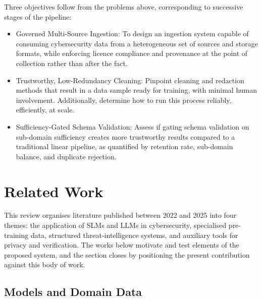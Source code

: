 \documentclass[conference]{IEEEtran}
\begin{document}
Three objectives follow from the problems above, corresponding to successive stages of the pipeline:
\begin{itemize}
\item Governed Multi-Source Ingestion: To design an ingestion system capable of consuming cybersecurity data from a heterogeneous set of sources and storage formats, while enforcing licence compliance and provenance at the point of collection rather than after the fact.
\item Trustworthy, Low-Redundancy Cleaning: Pinpoint cleaning and redaction methods that result in a data sample ready for training, with minimal human involvement. Additionally, determine how to run this process reliably, efficiently, at scale.
\item Sufficiency-Gated Schema Validation: Assess if gating schema validation on sub-domain sufficiency creates more trustworthy results compared to a traditional linear pipeline, as quantified by retention rate, sub-domain balance, and duplicate rejection.
\end{itemize}

\section{Related Work}

This review organises literature published between 2022 and 2025 into four themes: the application of SLMs and LLMs in cybersecurity, specialised pre-training data, structured threat-intelligence systems, and auxiliary tools for privacy and verification. The works below motivate and test elements of the proposed system, and the section closes by positioning the present contribution against this body of work.

\subsection{Models and Domain Data}
\end{document}
